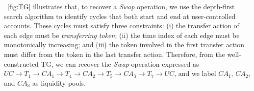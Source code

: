 \myfig~\ref{fig:TG} illustrates that, to recover a \textit{Swap} operation, we use the depth-first search algorithm to identify cycles that both start and end at user-controlled accounts.
These cycles must satisfy three constraints:
(i) the transfer action of each edge must be \textit{transferring token};
(ii) the time index of each edge must be monotonically increasing;
and (iii) the token involved in the first transfer action must differ from the token in the last transfer action.
Therefore, from the well-constructed TG, we can recover the \textit{Swap} operation expressed as $UC \rightarrow T_1 \rightarrow CA_1 \rightarrow T_4 \rightarrow CA_2 \rightarrow T_5 \rightarrow CA_3 \rightarrow T_7 \rightarrow UC$, and we label $CA_1$, $CA_2$, and $CA_3$ as liquidity pools.